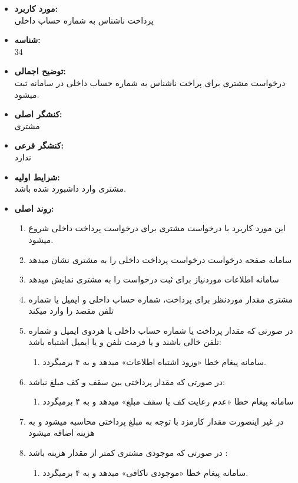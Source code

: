 \documentclass{article}
\begin{document}
\noindent\makebox[\linewidth]{\rule{\paperwidth}{0.4pt}}




\begin{itemize}
\item \textbf{مورد کاربرد:}\\
پرداخت ناشناس به شماره حساب داخلی
\item \textbf{شناسه:}\\
34
\item \textbf{توضیح اجمالی:}\\
درخواست مشتری برای پراخت ناشناس به شماره حساب داخلی در سامانه ثبت میشود.
\item \textbf{کنشگر اصلی:}\\
مشتری
\item \textbf{کنشگر فرعی:}\\
ندارد
\item \textbf{شرایط اولیه:}\\
مشتری وارد داشبورد شده باشد.
\item \textbf{روند اصلی:}\\
\begin{enumerate}
\item  این مورد کاربرد با درخواست مشتری برای درخواست پرداخت داخلی شروع میشود.
\item سامانه صفحه درخواست درخواست پرداخت داخلی را به مشتری نشان میدهد
\item سامانه اطلاعات موردنیاز برای ثبت درخواست را به مشتری نمایش میدهد
\item مشتری مقدار موردنظر برای پرداخت، شماره حساب داخلی و ایمیل یا شماره تلفن مقصد را وارد میکند
\item  در صورتی که مقدار پرداخت یا شماره حساب داخلی یا هردوی ایمیل و شماره تلفن خالی باشند و یا فرمت تلفن و یا ایمیل اشتباه باشد:
\begin{enumerate}
\item سامانه پیغام خطا «ورود اشتباه اطلاعات» میدهد و به ۴ برمیگردد. 
\end{enumerate}

\item در صورتی که مقدار پرداختی بین سقف و کف مبلغ نباشد:
\begin{enumerate}
\item سامانه پیغام خطا «عدم رعایت کف یا سقف مبلغ» میدهد و به ۴ برمیگردد
\end{enumerate}

\item در غیر اینصورت مقدار کارمزد با توجه به مبلغ پرداختی محاسبه میشود و به هزینه اضافه میشود
\item در صورتی که موجودی مشتری کمتر از مقدار هزینه باشد :
\begin{enumerate}
\item سامانه پیغام خطا «موجودی ناکافی» میدهد و به ۴ برمیگردد. 
\end{enumerate}


\end{enumerate}
\end{itemize}
\end{document}
